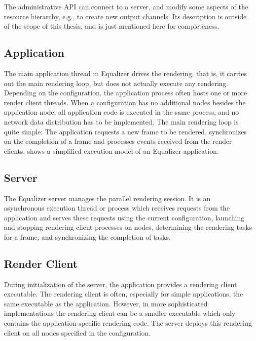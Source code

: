 The administrative API can connect to a server, and modify some aspects of the
resource hierarchy, e.g., to create new output channels. Its description is
outside of the scope of this thesis, and is just mentioned here for
completeness.

\subsection{Application}

The main application thread in Equalizer drives the rendering, that is, it
carries out the main rendering loop, but does not actually execute any
rendering. Depending on the configuration, the application process often hosts
one or more render client threads. When a configuration has no additional nodes
besides the application node, all application code is executed in the same
process, and no network data distribution has to be implemented. The main
rendering loop is quite simple: The application requests a new frame to be
rendered, synchronizes on the completion of a frame and processes events
received from the render clients.  shows a simplified
execution model of an Equalizer application.


\subsection{Server}

The Equalizer server manages the parallel rendering session. It is an
asynchronous execution thread or process which receives requests from the
application and serves these requests using the current configuration, launching
and stopping rendering client processes on nodes, determining the rendering
tasks for a frame, and synchronizing the completion of tasks.

\subsection{Render Client}

During initialization of the server, the application provides a rendering client
executable. The rendering client is often, especially for simple applications,
the same executable as the application. However, in more sophisticated
implementations the rendering client can be a smaller executable which only
contains the application-specific rendering code. The server deploys this
rendering client on all nodes specified in the configuration.

